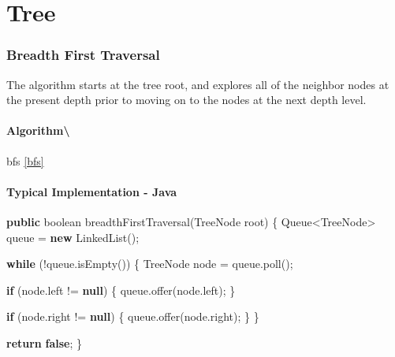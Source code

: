 \documentclass[]{book}
\newenvironment{Shaded}{\begin{snugshade}}{\end{snugshade}}
\newcommand{\BuiltInTok}[1]{#1}
\newcommand{\DataTypeTok}[1]{\textcolor[rgb]{0.13,0.29,0.53}{#1}}
\newcommand{\FunctionTok}[1]{\textcolor[rgb]{0.00,0.00,0.00}{#1}}
\newcommand{\KeywordTok}[1]{\textcolor[rgb]{0.13,0.29,0.53}{\textbf{#1}}}
\newcommand{\NormalTok}[1]{#1}
\begin{document}
\hypertarget{tree}{%
\chapter{Tree}\label{tree}}

\hypertarget{breadth-first-traversal}{%
\subsection{Breadth First Traversal}\label{breadth-first-traversal}}

The algorithm starts at the tree root, and explores all of the neighbor nodes at the present depth prior to moving
on to the nodes at the next depth level.

\hypertarget{algorithm-56}{%
\subsubsection{Algorithm\textbackslash{}}\label{algorithm-56}}

bfs \ref{bfs}

\hypertarget{typical-implementation---java}{%
\subsubsection{Typical Implementation - Java}\label{typical-implementation---java}}

\begin{Shaded}
\begin{Highlighting}[]
\KeywordTok{public} \DataTypeTok{boolean} \FunctionTok{breadthFirstTraversal}\NormalTok{(}\BuiltInTok{TreeNode}\NormalTok{ root) \{}
    \BuiltInTok{Queue}\NormalTok{<}\BuiltInTok{TreeNode}\NormalTok{> queue = }\KeywordTok{new} \BuiltInTok{LinkedList}\NormalTok{();}

    \KeywordTok{while}\NormalTok{ (!queue.}\FunctionTok{isEmpty}\NormalTok{()) \{}
        \BuiltInTok{TreeNode}\NormalTok{ node = queue.}\FunctionTok{poll}\NormalTok{();}

        \KeywordTok{if}\NormalTok{ (node.}\FunctionTok{left}\NormalTok{ != }\KeywordTok{null}\NormalTok{) \{}
\NormalTok{            queue.}\FunctionTok{offer}\NormalTok{(node.}\FunctionTok{left}\NormalTok{);}
\NormalTok{        \}}

        \KeywordTok{if}\NormalTok{ (node.}\FunctionTok{right}\NormalTok{ != }\KeywordTok{null}\NormalTok{) \{}
\NormalTok{            queue.}\FunctionTok{offer}\NormalTok{(node.}\FunctionTok{right}\NormalTok{);}
\NormalTok{        \}}
\NormalTok{    \}}

    \KeywordTok{return} \KeywordTok{false}\NormalTok{;}
\NormalTok{\}}
\end{Highlighting}
\end{Shaded}
\end{document}
